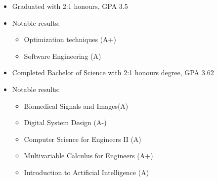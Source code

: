 \documentclass[a4paper,12pt]{memoir} %
\begin{document}
\userinformation %

\framebreak %










\begin{itemize}
	\item Graduated with 2:1 honours, GPA 3.5
	\item Notable results:
	\begin{itemize}
		\item Optimization techniques (A+)
		\item Software Engineering (A)
	\end{itemize}

\end{itemize}



\begin{itemize}
	\item Completed Bachelor of Science with 2:1 honours degree, GPA 3.62
	\item Notable results: 
	\begin{itemize}
		\item Biomedical Signals and Images(A) 
		\item Digital System Design (A-) 
		\item Computer Science for Engineers II (A) 	
		\item Multivariable Calculus for Engineers (A+) 
		\item Introduction to Artificial Intelligence (A)
	\end{itemize}
\end{itemize}
\end{document}
